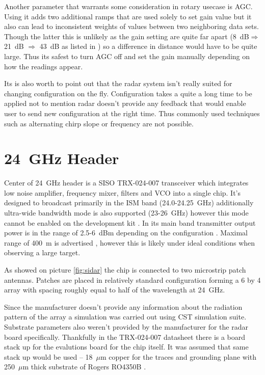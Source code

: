 Another parameter that warrants some consideration in rotary usecase is AGC.
Using it adds two additional ramps that are used solely to set gain value but it also can lead to inconsistent weights of values between two neighboring data sets.
Though the latter this is unlikely as the gain setting are quite far apart (8~dB$\Rightarrow$ 21~dB $\Rightarrow$ 43~dB as listed in \cite{sidarPRO}) so a difference in distance would have to be quite large.
Thus its safest to turn AGC off and set the gain manually depending on how the readings appear.

Its is also worth to point out that the radar system isn't really suited for changing configuration on the fly.
Configuration takes a quite a long time to be applied not to mention radar doesn't provide any feedback that would enable user to send new configuration at the right time.
Thus commonly used techniques such as alternating chirp slope or frequency are not possible.










\section{24~GHz Header}

Center of 24~GHz header is a SISO TRX-024-007 transceiver which integrates low noise amplifier, frequency mixer, filters and VCO into a single chip.
It's designed to broadcast primarily in the ISM band (24.0-24.25~GHz) additionally ultra-wide bandwidth mode is also supported (23-26~GHz) \cite{sidarTRX24} however this mode cannot be enabled on the development kit \cite{sidarPRO}.
In its main band transmitter output power is in the range of 2.5-6~dBm depending on the configuration \cite{sidarTRX24}.
Maximal range of 400~m is advertised \cite{sidarMANOld}, however this is likely under ideal conditions when observing a large target.

As showed on picture \ref{fig:sidar} the chip is connected to two microstrip patch antennas.
Patches are placed in relatively standard configuration forming a 6 by 4 array with spacing roughly equal to half of the wavelength at 24~GHz.

Since the manufacturer doesn't provide any information about the radiation pattern of the array a simulation was carried out using CST simulation suite.
Substrate parameters also weren't provided by the manufacturer for the radar board specifically.
Thankfully in the TRX-024-007 datasheet there is a board stack up for the evalutions board for the chip itself.
It was assumed that same stack up would be used -- 18~$\mu$m copper for the traces and grounding plane with 250~$\mu$m thick substrate of Rogers RO4350B \cite{sidarTRX24}.

